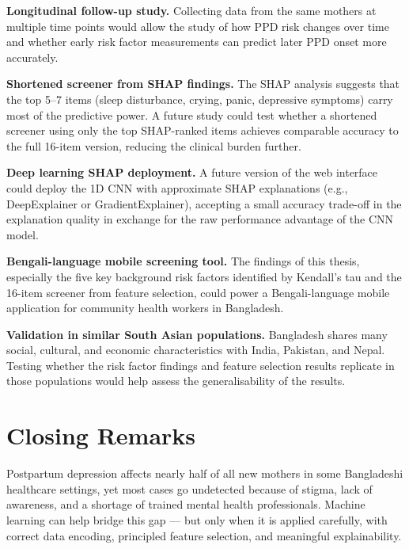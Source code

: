 \textbf{Longitudinal follow-up study.}
Collecting data from the same mothers at multiple time points would allow the study of how PPD risk changes over time and whether early risk factor measurements can predict later PPD onset more accurately.

\textbf{Shortened screener from SHAP findings.}
The SHAP analysis suggests that the top 5--7 items (sleep disturbance, crying, panic, depressive symptoms) carry most of the predictive power.
A future study could test whether a shortened screener using only the top SHAP-ranked items achieves comparable accuracy to the full 16-item version, reducing the clinical burden further.

\textbf{Deep learning SHAP deployment.}
A future version of the web interface could deploy the 1D CNN with approximate SHAP explanations (e.g., DeepExplainer or GradientExplainer), accepting a small accuracy trade-off in the explanation quality in exchange for the raw performance advantage of the CNN model.

\textbf{Bengali-language mobile screening tool.}
The findings of this thesis, especially the five key background risk factors identified by Kendall's tau and the 16-item screener from feature selection, could power a Bengali-language mobile application for community health workers in Bangladesh.

\textbf{Validation in similar South Asian populations.}
Bangladesh shares many social, cultural, and economic characteristics with India, Pakistan, and Nepal.
Testing whether the risk factor findings and feature selection results replicate in those populations would help assess the generalisability of the results.

\section{Closing Remarks}
\label{ch5-sec-closing}

Postpartum depression affects nearly half of all new mothers in some Bangladeshi healthcare settings, yet most cases go undetected because of stigma, lack of awareness, and a shortage of trained mental health professionals.
Machine learning can help bridge this gap --- but only when it is applied carefully, with correct data encoding, principled feature selection, and meaningful explainability.


